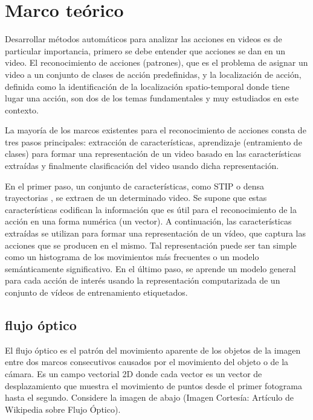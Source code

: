 \chapter{Marco teórico}
Desarrollar métodos automáticos para analizar las acciones en videos es de particular importancia, primero se debe entender que acciones se dan en un video. El reconocimiento de acciones (patrones), que es el problema de asignar un video a un conjunto de clases de acción predefinidas, y la localización de acción, definida como la identificación de la localización spatio-temporal donde tiene lugar una acción, son dos de los temas fundamentales y muy estudiados en este contexto.

La mayoría de los marcos existentes para el reconocimiento de acciones consta de tres pasos principales: extracción de características, aprendizaje (entramiento de clases) para formar una representación de un video basado en las características extraídas y finalmente clasificación del video usando dicha representación.

En el primer paso, un conjunto de características, como STIP \cite{laptev2005space} o densa trayectorias \cite{wang2011action,
wang2013dense}, se extraen de un determinado video. Se supone que estas características codifican la información que es útil para el reconocimiento de la acción en una forma numérica (un vector). A continuación, las características extraídas se utilizan para formar una representación de un vídeo, que captura las acciones que se producen en el mismo. Tal representación puede ser tan simple como un histograma de los movimientos más frecuentes \cite{wang2011action,
wang2013dense} o un modelo semánticamente significativo. En el último paso, se aprende un modelo general para cada acción de interés usando la representación computarizada de un conjunto de vídeos de entrenamiento etiquetados.


\section{flujo óptico}
El flujo óptico es el patrón del movimiento aparente de los objetos de la imagen entre dos marcos consecutivos causados por el movimiento del objeto o de la cámara. Es un campo vectorial 2D donde cada vector es un vector de desplazamiento que muestra el movimiento de puntos desde el primer fotograma hasta el segundo. Considere la imagen de abajo (Imagen Cortesía: Artículo de Wikipedia sobre Flujo Óptico).

